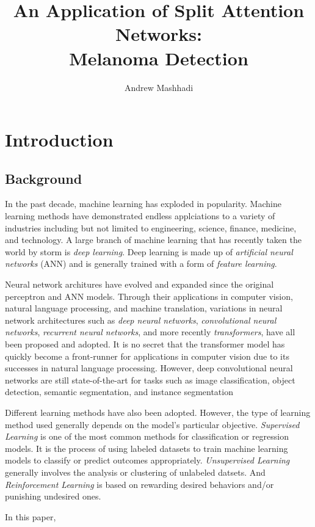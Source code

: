 \documentclass [MAS] {uclathes}
\title          {An Application of Split Attention Networks:\\
                Melanoma Detection}
\author         {Andrew Mashhadi}
\begin{document}
\makeintropages


\chapter{Introduction}

\section{Background}

In the past decade, machine learning has exploded in popularity. Machine learning methods have demonstrated endless applciations to a variety of industries including but not limited to engineering, science, finance, medicine, and technology. A large branch of machine learning that has recently taken the world by storm is \textit{deep learning}. Deep learning is made up of \textit{artificial neural networks} (ANN) and is generally trained with a form of \textit{feature learning}. 

Neural network architures have evolved and expanded since the original perceptron and ANN models. Through their applications in computer vision, natural language processing, and machine translation, variations in neural network architectures such as \textit{deep neural networks}, \textit{convolutional neural networks}, \textit{recurrent neural networks}, and more recently \textit{transformers}, have all been proposed and adopted. It is no secret that the transformer model has quickly become a front-runner for applications in computer vision due to its successes in natural language processing. However, deep convolutional neural networks are still state-of-the-art for tasks such as image classification, object detection, semantic segmentation, and instance segmentation

Different learning methods have also been adopted. However, the type of learning method used generally depends on the model's particular objective. \textit{Supervised Learning} is one of the most common methods for classification or regression models. It is the process of using labeled datasets to train machine learning models to classify or predict outcomes appropriately. \textit{Unsupervised Learning} generally involves the analysis or clustering of unlabeled datsets. And \textit{Reinforcement Learning} is based on rewarding desired behaviors and/or punishing undesired ones.

In this paper, 
\end{document}
